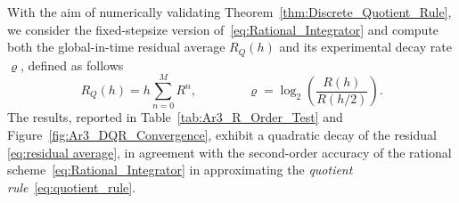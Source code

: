 \documentclass[11pt,letterpaper]{article}
\theoremstyle{remark}
\begin{document}
With the aim of numerically validating Theorem~\ref{thm:Discrete_Quotient_Rule}, we consider the fixed-stepsize version of~\eqref{eq:Rational_Integrator} and compute both the global-in-time residual average  $R_Q(h)$ and its experimental decay rate $\varrho$, defined as follows
\begin{equation}\label{eq:residual average}
    R_Q(h) = h\sum_{n=0}^{M} R^n, \qquad \qquad \varrho = \log_2\left( \frac{R(h)}{R\left(h/2\right)}\right).
\end{equation}
The results, reported in Table~\ref{tab:Ar3_R_Order_Test} and Figure~\ref{fig:Ar3_DQR_Convergence}, exhibit a quadratic decay of the residual \eqref{eq:residual average}, in agreement with the second-order accuracy of the rational scheme~\eqref{eq:Rational_Integrator} in approximating the \emph{quotient rule}~\eqref{eq:quotient_rule}.
\end{document}
